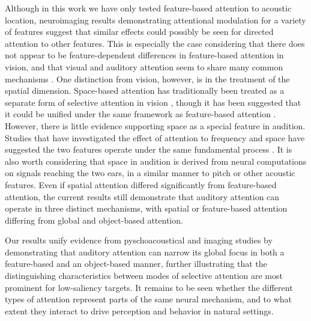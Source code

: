 \documentclass[9pt,twocolumn,twoside]{pnas-new}
\begin{document}
Although in this work we have only tested feature-based attention to acoustic location, neuroimaging results demonstrating attentional modulation for a variety of features suggest that similar effects could possibly be seen for directed attention to other features. This is especially the case considering that there does not appear to be feature-dependent differences in feature-based attention in vision, and that visual and auditory attention seem to share many common mechanisms \cite{Scholl01a,Busse05a}. One distinction from vision, however, is in the treatment of the spatial dimension. Space-based attention has traditionally been treated as a separate form of selective attention in vision \cite{soto2004spatial,Kravitz11a}, though it has been suggested that it could be unified under the same framework as feature-based attention \cite{maunsell2006feature}. However, there is little evidence supporting space as a special feature in audition. Studies that have investigated the effect of attention to frequency and space have suggested the two features operate under the same fundamental process \cite{Krumbholz07a,Maddox12a}. It is also worth considering that space in audition is derived from neural computations on signals reaching the two ears, in a similar manner to pitch or other acoustic features. Even if spatial attention differed significantly from feature-based attention, the current results still demonstrate that auditory attention can operate in three distinct mechanisms, with spatial or feature-based attention differing from global and object-based attention.

Our results unify evidence from pyschoacoustical and imaging studies by demonstrating that auditory attention can narrow its global focus in both a feature-based and an object-based manner, further illustrating that the distinguishing characteristics between modes of selective attention are most prominent for low-saliency targets. It remains to be seen whether the different types of attention represent parts of the same neural mechanism, and to what extent they interact to drive perception and behavior in natural settings.
\end{document}
